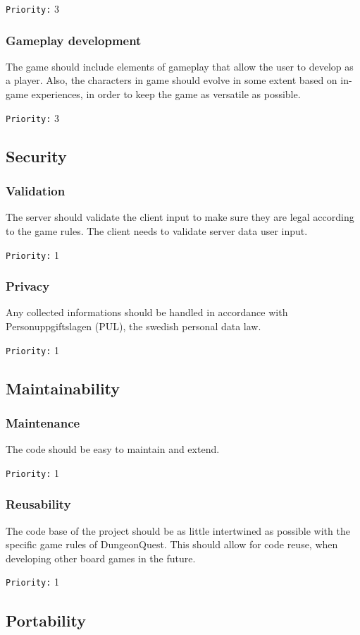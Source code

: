 \documentclass[a4paper,10pt]{article}
\newcommand{\prio}[1]{\texttt{Priority:} #1}
\begin{document}
\prio{3}

\subsubsection{Gameplay development}
The game should include elements of gameplay that allow the user to develop as a player. Also, the characters in game should evolve in some extent based on in-game experiences, in order to keep the game as versatile as possible.

\prio{3}

\subsection{Security}
\subsubsection{Validation}
\label{cheating}
The server should validate the client input to make sure they are legal according to the game rules. The client needs to validate server data user input. 

\prio{1}

\subsubsection{Privacy}
Any collected informations should be handled in accordance with Personuppgiftslagen (PUL), the swedish personal data law.

\prio{1}

\subsection{Maintainability}
\subsubsection{Maintenance}
The code should be easy to maintain and extend.

\prio{1}

\subsubsection{Reusability}
The code base of the project should be as little intertwined as possible with the specific game rules of DungeonQuest. This should allow for code reuse, when developing other board games in the future.

\prio{1}

\subsection{Portability}
\end{document}
